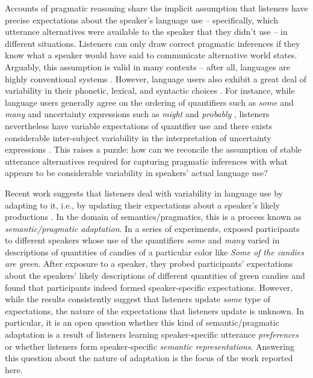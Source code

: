 \documentclass[man, floatsintext]{apa6}
\begin{document}
Accounts of pragmatic reasoning share the implicit assumption that listeners have precise expectations about the speaker's language use -- specifically, which utterance alternatives were available to the speaker that they didn't use -- in different situations. Listeners can only draw correct pragmatic inferences if they know what a speaker would have said to communicate alternative world states. Arguably, this assumption is valid in many contexts -- after all, languages are highly conventional systems \parencite{Lewis1969}. However, language users also exhibit a great deal of variability in their phonetic, lexical, and syntactic choices \parencite[e.g.,][]{Liberman1967,Weiner1983,Harrington2000,Finegan2001,Allen2003}. For instance, while language users generally agree on the ordering of quantifiers such as \textit{some} and \textit{many} and uncertainty expressions such as \textit{might} and \textit{probably} \parencite{Hammerton1976,JaffeKatz1989}, listeners nevertheless have variable expectations of quantifier use \parencite{Yildirim2016} and there exists considerable inter-subject variability in the interpretation of uncertainty expressions \parencite{Wallsten1986}. This raises a puzzle: how can we reconcile the assumption of stable utterance alternatives required for capturing pragmatic inferences with what appears to be considerable variability in speakers' actual language use?

Recent work suggests that listeners deal with variability in language use by adapting to it, i.e., by updating their expectations about a speaker's likely productions \parencite[e.g.,][]{Norris2003,Kraljic2005,Kleinschmidt2015,Kamide2012,Fine2016}. In the domain of semantics/pragmatics, this is a process known as \emph{semantic/pragmatic adaptation}. In a series of experiments, \textcite{Yildirim2016} exposed participants to different speakers whose use of the quantifiers \textit{some} and \textit{many} varied in descriptions of quantities of candies of a particular color like \emph{Some of the candies are green}. After exposure to a speaker, they probed participants' expectations about the speakers' likely descriptions of different quantities of green candies and found that participants indeed formed speaker-specific expectations. However, while the results consistently suggest that listeners update \textit{some} type of expectations, the nature of the expectations that listeners update is unknown. 
In particular, it is an open question whether this kind of semantic/pragmatic adaptation is a result of listeners learning speaker-specific utterance \emph{preferences} or whether listeners form speaker-specific \emph{semantic representations}. Answering this question about the nature of adaptation is  the focus of the work reported here.
\end{document}
